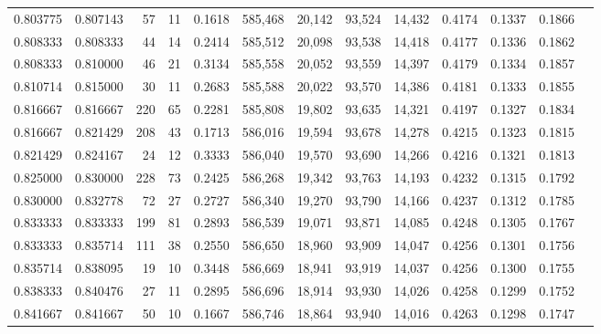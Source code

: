 \begin{tabular}{rrrrrrrrrrrrr}
0.803775 & 0.807143 &     57 &     11 &                                     0.1618 & 585,468 &  20,142 &  93,524 &  14,432 & 0.4174 & 0.1337 & 0.1866 \\
0.808333 & 0.808333 &     44 &     14 &                                     0.2414 & 585,512 &  20,098 &  93,538 &  14,418 & 0.4177 & 0.1336 & 0.1862 \\
0.808333 & 0.810000 &     46 &     21 &                                     0.3134 & 585,558 &  20,052 &  93,559 &  14,397 & 0.4179 & 0.1334 & 0.1857 \\
0.810714 & 0.815000 &     30 &     11 &                                     0.2683 & 585,588 &  20,022 &  93,570 &  14,386 & 0.4181 & 0.1333 & 0.1855 \\
0.816667 & 0.816667 &    220 &     65 &                                     0.2281 & 585,808 &  19,802 &  93,635 &  14,321 & 0.4197 & 0.1327 & 0.1834 \\
0.816667 & 0.821429 &    208 &     43 &                                     0.1713 & 586,016 &  19,594 &  93,678 &  14,278 & 0.4215 & 0.1323 & 0.1815 \\
0.821429 & 0.824167 &     24 &     12 &                                     0.3333 & 586,040 &  19,570 &  93,690 &  14,266 & 0.4216 & 0.1321 & 0.1813 \\
0.825000 & 0.830000 &    228 &     73 &                                     0.2425 & 586,268 &  19,342 &  93,763 &  14,193 & 0.4232 & 0.1315 & 0.1792 \\
0.830000 & 0.832778 &     72 &     27 &                                     0.2727 & 586,340 &  19,270 &  93,790 &  14,166 & 0.4237 & 0.1312 & 0.1785 \\
0.833333 & 0.833333 &    199 &     81 &                                     0.2893 & 586,539 &  19,071 &  93,871 &  14,085 & 0.4248 & 0.1305 & 0.1767 \\
0.833333 & 0.835714 &    111 &     38 &                                     0.2550 & 586,650 &  18,960 &  93,909 &  14,047 & 0.4256 & 0.1301 & 0.1756 \\
0.835714 & 0.838095 &     19 &     10 &                                     0.3448 & 586,669 &  18,941 &  93,919 &  14,037 & 0.4256 & 0.1300 & 0.1755 \\
0.838333 & 0.840476 &     27 &     11 &                                     0.2895 & 586,696 &  18,914 &  93,930 &  14,026 & 0.4258 & 0.1299 & 0.1752 \\
0.841667 & 0.841667 &     50 &     10 &                                     0.1667 & 586,746 &  18,864 &  93,940 &  14,016 & 0.4263 & 0.1298 & 0.1747 \\

\end{tabular}

